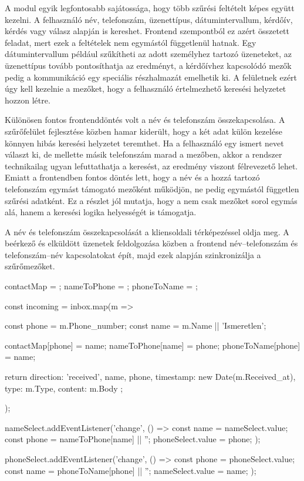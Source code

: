 A modul egyik legfontosabb sajátossága, hogy több szűrési feltételt képes együtt kezelni. A felhasználó név, telefonszám, üzenettípus, dátumintervallum, kérdőív, kérdés vagy válasz alapján is kereshet. Frontend szempontból ez azért összetett feladat, mert ezek a feltételek nem egymástól függetlenül hatnak. Egy dátumintervallum például szűkítheti az adott személyhez tartozó üzeneteket, az üzenettípus tovább pontosíthatja az eredményt, a kérdőívhez kapcsolódó mezők pedig a kommunikáció egy speciális részhalmazát emelhetik ki. A felületnek ezért úgy kell kezelnie a mezőket, hogy a felhasználó értelmezhető keresési helyzetet hozzon létre. 

Különösen fontos frontenddöntés volt a név és telefonszám összekapcsolása. A szűrőfelület fejlesztése közben hamar kiderült, hogy a két adat külön kezelése könnyen hibás keresési helyzetet teremthet. Ha a felhasználó egy ismert nevet választ ki, de mellette másik telefonszám marad a mezőben, akkor a rendszer technikailag ugyan lefuttathatja a keresést, az eredmény viszont félrevezető lehet. Emiatt a frontendben fontos döntés lett, hogy a név és a hozzá tartozó telefonszám egymást támogató mezőként működjön, ne pedig egymástól független szűrési adatként. Ez a részlet jól mutatja, hogy a  nem csak mezőket sorol egymás alá, hanem a keresési logika helyességét is támogatja.

A név és telefonszám összekapcsolását a  kliensoldali térképezéssel oldja meg. A beérkező és elküldött üzenetek feldolgozása közben a frontend név–telefonszám és telefonszám–név kapcsolatokat épít, majd ezek alapján szinkronizálja a szűrőmezőket.

\begin{CodeBlock}
contactMap = {};
nameToPhone = {};
phoneToName = {};

const incoming = inbox.map(m => {
  const phone = m.Phone_number;
  const name = m.Name || 'Ismeretlen';

  contactMap[phone] = name;
  nameToPhone[name] = phone;
  phoneToName[phone] = name;

  return {
    direction: 'received',
    name,
    phone,
    timestamp: new Date(m.Received_at),
    type: m.Type,
    content: m.Body
  };
});

nameSelect.addEventListener('change', () => {
  const name = nameSelect.value;
  const phone = nameToPhone[name] || '';
  phoneSelect.value = phone;
});

phoneSelect.addEventListener('change', () => {
  const phone = phoneSelect.value;
  const name = phoneToName[phone] || '';
  nameSelect.value = name;
});
\end{CodeBlock}

